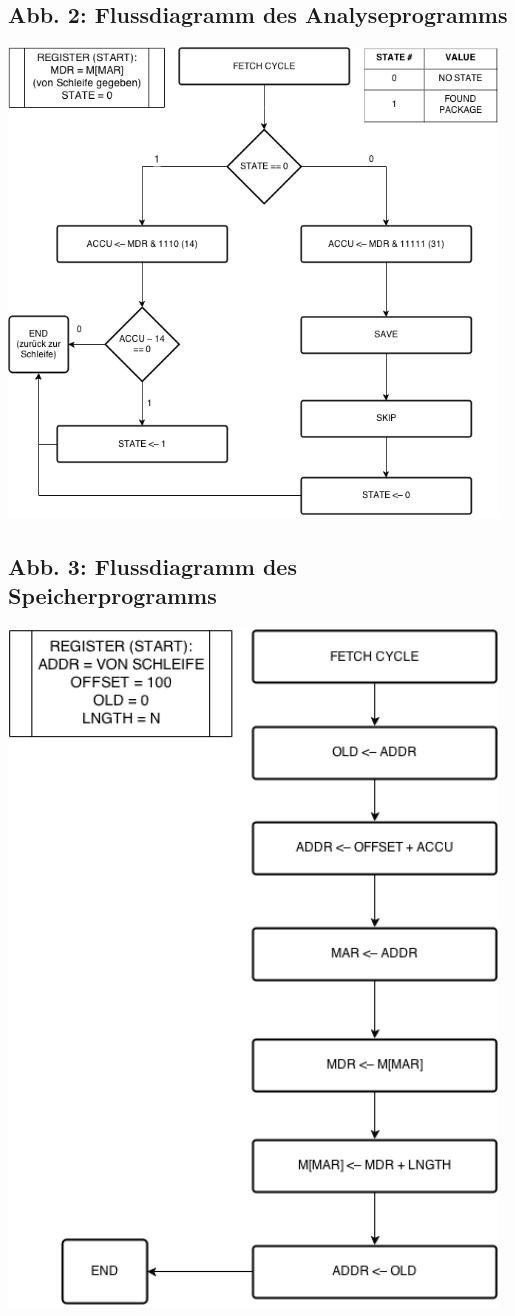 \documentclass[12pt,titlepage]{article}
\begin{document}
\subsection{Abb. 2: Flussdiagramm des Analyseprogramms}
\includegraphics[width=13cm]{analyseData.png}

\subsection{Abb. 3: Flussdiagramm des Speicherprogramms}
\includegraphics[width=13cm]{saveToHS.png}
\end{document}
